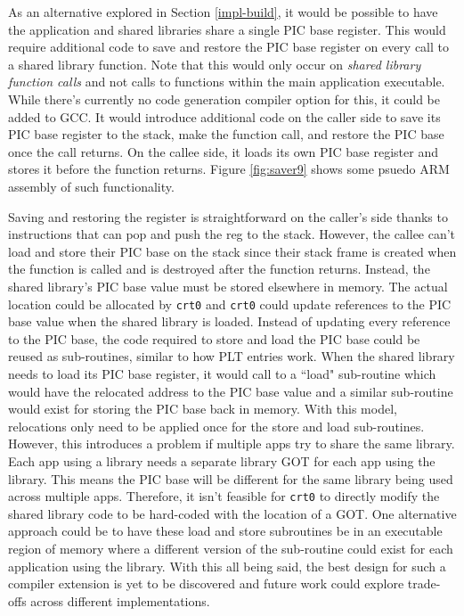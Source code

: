 \documentclass[12pt]{ucsddissertation}
\begin{document}
As an alternative explored in Section \ref{impl-build}, it would be possible to have the application and shared libraries share a single PIC base register. This would require additional code to save and restore the PIC base register on every call to a shared library function. Note that this would only occur on \textit{shared library function calls} and not calls to functions within the main application executable.  While there's currently no code generation compiler option for this, it could be added to GCC. It would introduce additional code on the caller side to save its PIC base register to the stack, make the function call, and restore the PIC base once the call returns. On the callee side, it loads its own PIC base register and stores it before the function returns. Figure \ref{fig:saver9} shows some psuedo ARM assembly of such functionality. 

Saving and restoring the register is straightforward on the caller's side thanks to instructions that can pop and push the reg to the stack. However, the callee can't load and store their PIC base on the stack since their stack frame is created when the function is called and is destroyed after the function returns. Instead, the shared library's PIC base value must be stored elsewhere in memory. The actual location could be allocated by \texttt{crt0} and \texttt{crt0} could update references to the PIC base value when the shared library is loaded. Instead of updating every reference to the PIC base, the code required to store and load the PIC base could be reused as sub-routines, similar to how PLT entries work. When the shared library needs to load its PIC base register, it would call to a ``load" sub-routine which would have the relocated address to the PIC base value and a similar sub-routine would exist for storing the PIC base back in memory. With this model, relocations only need to be applied once for the store and load sub-routines. However, this introduces a problem if multiple apps try to share the same library. Each app using a library needs a separate library GOT for each app using the library. This means the PIC base will be different for the same library being used across multiple apps. Therefore, it isn't feasible for \texttt{crt0} to directly modify the shared library code to be hard-coded with the location of a GOT. One alternative approach could be to have these load and store subroutines be in an executable region of memory where a different version of the sub-routine could exist for each application using the library. With this all being said, the best design for such a compiler extension is yet to be discovered and future work could explore trade-offs across different implementations.
\end{document}
